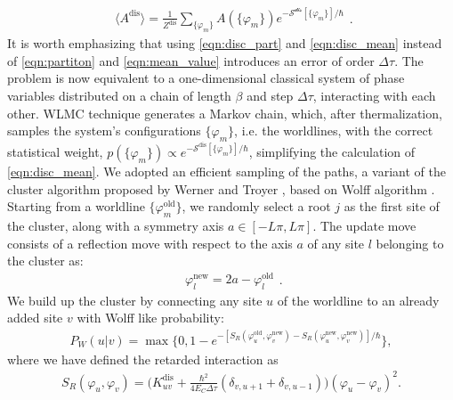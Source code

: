 \documentclass[aps,notitlepage,twocolumn,prl,nolongbibliography,superscriptaddress]{revtex4-2}
\begin{document}
\begin{equation}\label{eqn:disc_mean}\begin{split}
    \langle A^{\text{dis}} \rangle =\frac{1}{Z^{\text{dis}}} \sum_{\{\varphi_m\}}A(\{\varphi_m\})e^{-\mathcal{S^{\text{dis}}}[\{\varphi_m\}]/\hbar}
    \end{split}.
\end{equation}
It is worth emphasizing that using \eqref{eqn:disc_part} and \eqref{eqn:disc_mean} instead of \eqref{eqn:partiton} and \eqref{eqn:mean_value} introduces an error of order $\Delta \tau$. The problem is now equivalent to a one-dimensional classical system of phase variables distributed on a chain of length $\beta$ and step $\Delta \tau$, interacting with each other. WLMC technique generates a Markov chain, which, after thermalization, samples the system's configurations $\{\varphi_m\}$, i.e. the worldlines, with the correct statistical weight, $p(\{\varphi_m\}) \propto e^{-\mathcal{S}^{\text{dis}}[\{\varphi_m\}]/\hbar}$, simplifying the calculation of \eqref{eqn:disc_mean}. We adopted an efficient sampling of the paths, a variant of the cluster algorithm proposed by Werner and Troyer \cite{Troyer_MC,Troyer_PRL}, based on Wolff algorithm \cite{Wolff_PRL}. Starting from a worldline $\{\varphi^{\text{old}}_m\}$, we randomly select a root $j$ as the first site of the cluster, along with a symmetry axis $a \in [-L\pi, L\pi]$. The update move consists of a reflection move with respect to the axis $a$ of any site $l$ belonging to the cluster as:
\begin{equation}\label{eqn:update}\begin{split}
    \varphi_l^\text{new} = 2a -\varphi_l^{\text{old}}
    \end{split}.
\end{equation}
We build up the cluster by connecting any site $u$ of the worldline to an already added site $v$ with Wolff like probability:
\begin{equation}\label{eqn:prob_wolff}\begin{split}
    P_W(u|v)  = \max\biggl\{0, 1 -e^{-[S_{R}(\varphi^{\text{old}}_u,\varphi_v^{\text{new}})-S_R(\varphi^{\text{new}}_u,\varphi_v^{\text{new}})]/\hbar} \biggr\},
    \end{split}
\end{equation}
where we have defined the retarded interaction as
\begin{equation}\label{eqn:ret_action}\begin{split}
    S_R(\varphi_u,\varphi_v) =  \biggl( K^{\text{dis}}_{uv} +  \frac{\hbar^2}{4E_C\Delta \tau} (\delta_{v,u+1} + \delta_{v,u-1}) \biggr)(\varphi_u-\varphi_v)^2.
    \end{split}
\end{equation}
\end{document}
